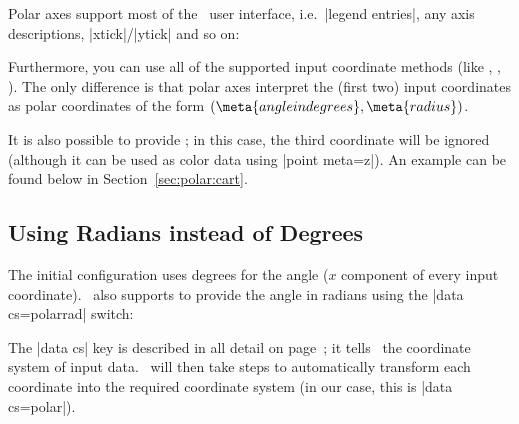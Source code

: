 {Polar axes support most of the \PGFPlots\ user interface, i.e.\ |legend entries|, any axis descriptions, |xtick|/|ytick| and so on:
\begin{codeexample}[]
\end{codeexample}
\noindent Furthermore, you can use all of the supported input coordinate methods (like , , ). The only difference is that polar axes interpret the (first two) input coordinates as polar coordinates of the form $(\meta{angle in degrees},\meta{radius})$.

It is also possible to provide ; in this case, the third coordinate will be ignored (although it can be used as color data using |point meta=z|). An example can be found below in Section~\ref{sec:polar:cart}.


\subsection{Using Radians instead of Degrees}
The initial configuration uses degrees for the angle ($x$ component of every input coordinate). \PGFPlots\ also supports to provide the angle in radians using the |data cs=polarrad| switch:
\begin{codeexample}[]
\end{codeexample}
The |data cs| key is described in all detail on page~\pageref{key:data:cs}; it tells \PGFPlots\ the coordinate system of input data. \PGFPlots\ will then take steps to automatically transform each coordinate into the required coordinate system (in our case, this is |data cs=polar|).

}
